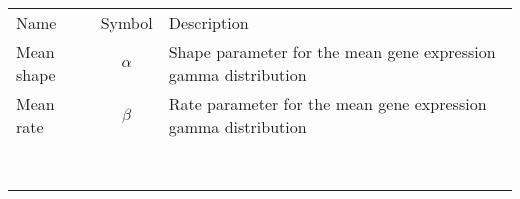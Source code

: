 \begin{table} 
    \begin{tabular}{ l c l }
        Name & Symbol & Description \\ 
        Mean shape & $\alpha$ & Shape parameter for the mean gene expression gamma distribution \\ 
        Mean rate & $\beta$ & Rate parameter for the mean gene expression gamma distribution \\ 
         &  &  \\ 
         &  &  \\ 
         &  &  \\ 
         &  &  \\ 
         &  &  \\ 
         &  &  \\ 
         &  &  \\ 
         &  &  \\ 
    \end{tabular} 
\end{table}